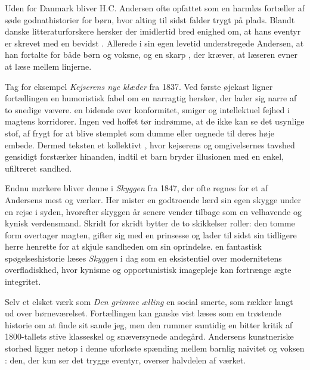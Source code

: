 Uden for Danmark bliver H.C. Andersen ofte opfattet som en harmløs fortæller af søde godnathistorier for børn, hvor alting til sidst falder trygt på plads. Blandt danske litteraturforskere hersker der imidlertid bred enighed om, at hans eventyr er skrevet med en bevidst . Allerede i sin egen levetid understregede Andersen, at han fortalte for både børn og voksne, og  en skarp , der kræver, at læseren evner at læse mellem linjerne.

Tag for eksempel \textit{Kejserens nye klæder} fra 1837. Ved første øjekast ligner fortællingen en humoristisk fabel om en narragtig hersker, der lader sig narre af to snedige vævere.  en bidende  over konformitet, smiger og intellektuel fejhed i magtens korridorer. Ingen ved hoffet tør indrømme, at de ikke kan se det usynlige stof, af frygt for at blive stemplet som dumme eller uegnede til deres høje embede. Dermed  teksten et kollektivt , hvor kejserens  og omgivelsernes tavshed gensidigt forstærker hinanden, indtil et barn bryder illusionen med en enkel, ufiltreret sandhed.

Endnu mørkere bliver denne  i \textit{Skyggen} fra 1847, der ofte regnes for et af Andersens mest  og  værker. Her mister en godtroende lærd sin egen skygge under en rejse i syden, hvorefter skyggen år senere vender tilbage som en velhavende og kynisk verdensmand. Skridt for skridt bytter de to skikkelser roller: den tomme form overtager magten, gifter sig med en prinsesse og lader til sidst sin tidligere herre henrette for at skjule sandheden om sin oprindelse.  en fantastisk spøgelseshistorie læses \textit{Skyggen} i dag som en eksistentiel  over modernitetens overfladiskhed, hvor kynisme og opportunistisk imagepleje kan fortrænge ægte integritet.

Selv et elsket værk som \textit{Den grimme ælling}  en social smerte, som rækker langt ud over børneværelset. Fortællingen kan ganske vist læses som en trøstende historie om at finde sit sande jeg, men den rummer samtidig en bitter kritik af 1800-tallets stive klasseskel og snæversynede andegård. Andersens kunstneriske storhed ligger netop i denne uforløste spænding mellem barnlig naivitet og voksen : den, der kun ser det trygge eventyr, overser halvdelen af værket.

